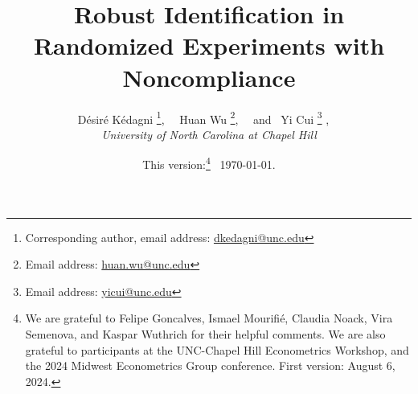 \documentclass[12pt]{article}
\theoremstyle{plain}
\theoremstyle{definition}
\theoremstyle{remark}
\begin{document}
\title{Robust Identification in Randomized Experiments with Noncompliance}
\author{
D\'{e}sir\'{e} K\'{e}dagni \thanks{Corresponding author, email address: \href{mailto: dkedagni@unc.edu}{dkedagni@unc.edu}}, \ \
Huan Wu \thanks{Email address: \href{mailto: huan.wu@unc.edu}{huan.wu@unc.edu}}, \ \ and \ 
Yi Cui \thanks{Email address: \href{mailto: yicui@unc.edu}{yicui@unc.edu}}
,\ \
\\
\textit{University of North Carolina at Chapel Hill}
}
\date{This version:\thanks{We are grateful to Felipe Goncalves, Ismael Mourifi\'e, Claudia Noack, Vira Semenova, and Kaspar Wuthrich for their helpful comments. We are also grateful to participants at the UNC-Chapel Hill Econometrics Workshop, and the 2024 Midwest Econometrics Group conference. First version: August 6, 2024.} \ \today.%
}
\maketitle
\onehalfspacing
\end{document}
